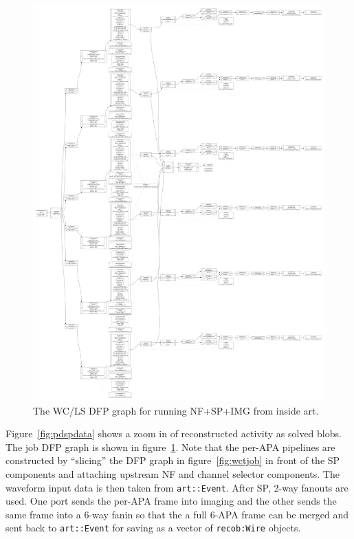 \documentclass[11pt]{article}
\begin{document}
\begin{figure}[htbp]
\centering
\includegraphics[width=\textwidth]{figs/wcls-nf-sp-img.pdf}
\caption{\label{fig:pdspjob}
The WC/LS DFP graph for running NF+SP+IMG from inside art.}
\end{figure}


Figure~\ref{fig:pdspdata} shows a zoom in of reconstructed activity as solved blobs.  The job DFP graph is shown in figure~\ref{fig:pdspjob}.  Note that the per-APA pipelines are constructed by ``slicing'' the DFP graph in figure~\ref{fig:wctjob} in front of the SP components and attaching upstream NF and channel selector components.  The waveform input data is then taken from \texttt{art::Event}.  After SP, 2-way fanouts are used.  One port sends the per-APA frame into imaging and the other sends the same frame into a 6-way fanin so that the a full 6-APA frame can be merged and sent back to \texttt{art::Event} for saving as a vector of \texttt{recob:Wire} objects.
\end{document}
